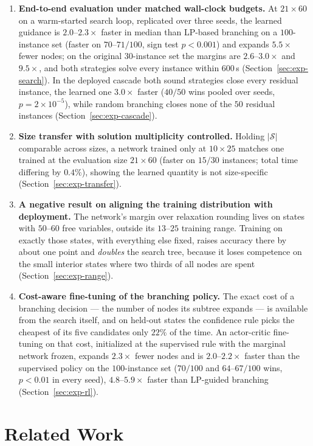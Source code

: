 \documentclass[final,5p,times,twocolumn]{elsarticle}
\newcommand{\SOL}{\mathcal{S}}
\begin{document}
\begin{enumerate}
\item \textbf{End-to-end evaluation under matched wall-clock budgets.} At $21\times60$ on a warm-started search loop, replicated over three seeds, the learned guidance is $2.0$--$2.3\times$ faster in median than LP-based branching on a $100$-instance set (faster on $70$--$71/100$, sign test $p<0.001$) and expands $5.5\times$ fewer nodes; on the original $30$-instance set the margins are $2.6$--$3.0\times$ and $9.5\times$, and both strategies solve every instance within $600$\,s (Section~\ref{sec:exp-search}). In the deployed cascade both sound strategies close every residual instance, the learned one $3.0\times$ faster ($40/50$ wins pooled over seeds, $p=2\times10^{-5}$), while random branching closes none of the $50$ residual instances (Section~\ref{sec:exp-cascade}).

\item \textbf{Size transfer with solution multiplicity controlled.} Holding $|\SOL|$ comparable across sizes, a network trained only at $10\times25$ matches one trained at the evaluation size $21\times60$ (faster on $15/30$ instances; total time differing by $0.4\%$), showing the learned quantity is not size-specific (Section~\ref{sec:exp-transfer}).
\item \textbf{A negative result on aligning the training distribution with deployment.} The network's margin over relaxation rounding lives on states with $50$--$60$ free variables, outside its $13$--$25$ training range. Training on exactly those states, with everything else fixed, raises accuracy there by about one point and \emph{doubles} the search tree, because it loses competence on the small interior states where two thirds of all nodes are spent (Section~\ref{sec:exp-range}).
\item \textbf{Cost-aware fine-tuning of the branching policy.} The exact cost of a branching decision --- the number of nodes its subtree expands --- is available from the search itself, and on held-out states the confidence rule picks the cheapest of its five candidates only $22\%$ of the time. An actor-critic fine-tuning on that cost, initialized at the supervised rule with the marginal network frozen, expands $2.3\times$ fewer nodes and is $2.0$--$2.2\times$ faster than the supervised policy on the $100$-instance set ($70/100$ and $64$--$67/100$ wins, $p<0.01$ in every seed), $4.8$--$5.9\times$ faster than LP-guided branching (Section~\ref{sec:exp-rl}).
\end{enumerate}

\section{Related Work}
\label{sec:related}
\end{document}
